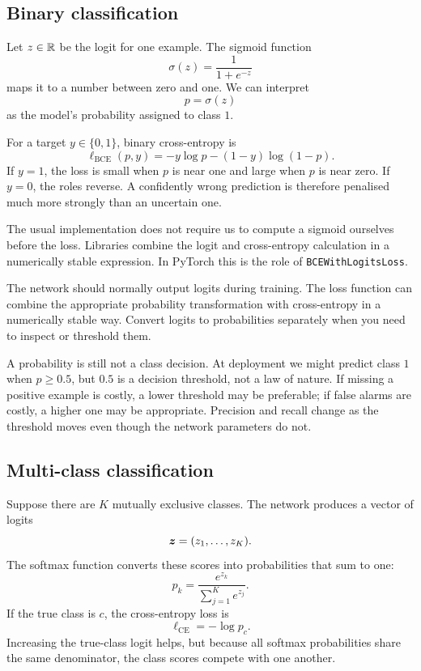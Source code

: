 \subsection{Binary classification}

Let \(z\in\mathbb{R}\) be the logit for one example. The sigmoid function
\begin{equation}
  \sigma(z)=\frac{1}{1+e^{-z}}
\end{equation}
maps it to a number between zero and one. We can interpret
\[
  p = \sigma(z)
\]
as the model's probability assigned to class \(1\).

For a target \(y\in\{0,1\}\), binary cross-entropy is
\begin{equation}
  \ell_{\mathrm{BCE}}(p,y)
  = -y\log p -(1-y)\log(1-p).
  \label{eq:week4-bce}
\end{equation}
If \(y=1\), the loss is small when \(p\) is near one and large when \(p\) is near zero. If \(y=0\), the roles reverse. A confidently wrong prediction is therefore penalised much more strongly than an uncertain one.

The usual implementation does not require us to compute a sigmoid ourselves before the loss. Libraries combine the logit and cross-entropy calculation in a numerically stable expression. In PyTorch this is the role of \texttt{BCEWithLogitsLoss}.

\begin{keyidea}
The network should normally output logits during training. The loss function can combine the appropriate probability transformation with cross-entropy in a numerically stable way. Convert logits to probabilities separately when you need to inspect or threshold them.
\end{keyidea}

A probability is still not a class decision. At deployment we might predict class \(1\) when \(p\ge 0.5\), but \(0.5\) is a decision threshold, not a law of nature. If missing a positive example is costly, a lower threshold may be preferable; if false alarms are costly, a higher one may be appropriate. Precision and recall change as the threshold moves even though the network parameters do not.

\subsection{Multi-class classification}

Suppose there are \(K\) mutually exclusive classes. The network produces a vector of logits
\[
  \bm{z}=(z_1,\ldots,z_K).
\]
The softmax function converts these scores into probabilities that sum to one:
\begin{equation}
  p_k = \frac{e^{z_k}}{\sum_{j=1}^{K} e^{z_j}}.
  \label{eq:week4-softmax}
\end{equation}
If the true class is \(c\), the cross-entropy loss is
\begin{equation}
  \ell_{\mathrm{CE}} = -\log p_c.
\end{equation}
Increasing the true-class logit helps, but because all softmax probabilities share the same denominator, the class scores compete with one another.

